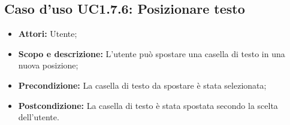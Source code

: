 \subsection{Caso d'uso UC1.7.6: Posizionare testo}
\begin{itemize}
	\item \textbf{Attori:} Utente;
	\item \textbf{Scopo e descrizione:} L'utente può spostare una casella di testo in una nuova posizione;
	\item \textbf{Precondizione:} La casella di testo da spostare è stata selezionata;
	\item \textbf{Postcondizione:} La casella di testo è stata spostata secondo la scelta dell'utente.
\end{itemize}
